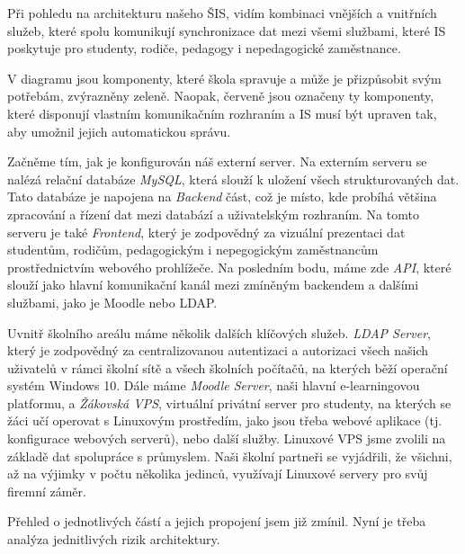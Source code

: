 \documentclass[FM,Proj]{tulthesis}
\begin{document}


Při pohledu na architekturu našeho ŠIS, vidím kombinaci vnějších a vnitřních služeb,
které spolu komunikují synchronizace dat mezi všemi službami, které IS poskytuje pro studenty,
rodiče, pedagogy i nepedagogické zaměstnance.

V diagramu jsou komponenty, které škola spravuje a může je přizpůsobit svým potřebám,
zvýrazněny zeleně. Naopak, červeně jsou označeny ty komponenty, které disponují vlastním
komunikačním rozhraním a IS musí být upraven tak, aby umožnil jejich automatickou správu.

Začněme tím, jak je konfigurován náš externí server.
Na externím serveru se nalézá relační databáze \textit{MySQL}, která slouží k uložení všech  
strukturovaných dat. Tato databáze je napojena na \textit{Backend} část, což je místo, kde probíhá
většina zpracování a řízení dat mezi databází a uživatelským rozhraním. Na tomto serveru je také
\textit{Frontend}, který je zodpovědný za vizuální prezentaci dat studentům, rodičům, pedagogickým i
nepegogickým zaměstnancům prostřednictvím webového prohlížeče. Na posledním bodu, máme zde \textit{API},
které slouží jako hlavní komunikační kanál mezi zmíněným backendem a dalšími službami,
jako je Moodle nebo LDAP.

Uvnitř školního areálu máme několik dalších klíčových služeb. \textit{LDAP Server}, který je
zodpovědný za centralizovanou autentizaci a autorizaci všech našich uživatelů v rámci školní
sítě a všech školních počítačů, na kterých běží operační systém Windows 10. Dále máme \textit{Moodle Server},
naši hlavní e-learningovou platformu, a \textit{Žákovská VPS}, 
virtuální privátní server pro studenty, na kterých se žáci učí operovat s Linuxovým prostředím,
jako jsou třeba webové aplikace (tj. konfigurace webových serverů), nebo další služby.
Linuxové VPS jsme zvolili na základě dat spolupráce s průmyslem. Naši školní partneři se vyjádřili,
že všichni, až na výjimky v počtu několika jedinců, využívají Linuxové servery pro svůj firemní záměr. 

Přehled o jednotlivých částí a jejich propojení jsem již zmínil. Nyní je třeba analýza jednitlivých rizik architektury.
\end{document}
